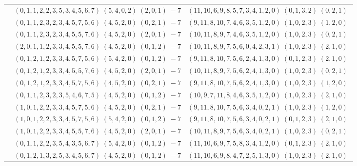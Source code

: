 \documentclass[11pt]{article}
\begin{document}
\begin{longtable}[l]{|c|c|c|}
 \cline{2-3} 
 & $(0 ,1 ,1 ,2 ,2 ,3 ,5 ,3 ,4 ,5 ,6 ,7) \;(5 ,4 ,0 ,2) \;(2 ,0 ,1) \;-7$ & $(11 ,10 ,6 ,9 ,8 ,5 ,7 ,3 ,4 ,1 ,2 ,0) \;(0 ,1 ,3 ,2) \;(0 ,2 ,1) \;$\\ 
 \cline{2-3} 
 & $(0 ,1 ,1 ,2 ,3 ,2 ,3 ,4 ,5 ,7 ,5 ,6) \;(4 ,5 ,2 ,0) \;(0 ,2 ,1) \;-7$ & $(9 ,11 ,8 ,10 ,7 ,4 ,6 ,3 ,5 ,1 ,2 ,0) \;(1 ,0 ,2 ,3) \;(1 ,2 ,0) \;$\\ 
 \cline{2-3} 
 & $(0 ,1 ,1 ,2 ,3 ,2 ,3 ,4 ,5 ,5 ,7 ,6) \;(4 ,5 ,2 ,0) \;(2 ,0 ,1) \;-7$ & $(10 ,11 ,8 ,9 ,7 ,4 ,6 ,3 ,5 ,1 ,2 ,0) \;(1 ,0 ,2 ,3) \;(0 ,2 ,1) \;$\\ 
 \cline{2-3} 
 & $(2 ,0 ,1 ,1 ,2 ,3 ,3 ,4 ,5 ,5 ,7 ,6) \;(4 ,5 ,2 ,0) \;(0 ,1 ,2) \;-7$ & $(10 ,11 ,8 ,9 ,7 ,5 ,6 ,0 ,4 ,2 ,3 ,1) \;(1 ,0 ,2 ,3) \;(2 ,1 ,0) \;$\\ 
 \cline{2-3} 
 & $(0 ,1 ,2 ,1 ,2 ,3 ,3 ,4 ,5 ,7 ,5 ,6) \;(5 ,4 ,2 ,0) \;(0 ,1 ,2) \;-7$ & $(9 ,11 ,8 ,10 ,7 ,5 ,6 ,2 ,4 ,1 ,3 ,0) \;(0 ,1 ,2 ,3) \;(2 ,1 ,0) \;$\\ 
 \cline{2-3} 
 & $(0 ,1 ,2 ,1 ,2 ,3 ,3 ,4 ,5 ,5 ,7 ,6) \;(4 ,5 ,2 ,0) \;(2 ,0 ,1) \;-7$ & $(10 ,11 ,8 ,9 ,7 ,5 ,6 ,2 ,4 ,1 ,3 ,0) \;(1 ,0 ,2 ,3) \;(0 ,2 ,1) \;$\\ 
 \cline{2-3} 
 & $(0 ,1 ,2 ,1 ,2 ,3 ,3 ,4 ,5 ,7 ,5 ,6) \;(4 ,5 ,2 ,0) \;(0 ,2 ,1) \;-7$ & $(9 ,11 ,8 ,10 ,7 ,5 ,6 ,2 ,4 ,1 ,3 ,0) \;(1 ,0 ,2 ,3) \;(1 ,2 ,0) \;$\\ 
 \cline{2-3} 
 & $(0 ,1 ,1 ,2 ,3 ,2 ,3 ,5 ,4 ,6 ,7 ,5) \;(4 ,5 ,2 ,0) \;(0 ,1 ,2) \;-7$ & $(10 ,9 ,7 ,11 ,8 ,4 ,6 ,3 ,5 ,1 ,2 ,0) \;(1 ,0 ,2 ,3) \;(2 ,1 ,0) \;$\\ 
 \cline{2-3} 
 & $(1 ,0 ,1 ,2 ,2 ,3 ,3 ,4 ,5 ,7 ,5 ,6) \;(4 ,5 ,2 ,0) \;(0 ,2 ,1) \;-7$ & $(9 ,11 ,8 ,10 ,7 ,5 ,6 ,3 ,4 ,0 ,2 ,1) \;(1 ,0 ,2 ,3) \;(1 ,2 ,0) \;$\\ 
 \cline{2-3} 
 & $(1 ,0 ,1 ,2 ,2 ,3 ,3 ,4 ,5 ,7 ,5 ,6) \;(5 ,4 ,2 ,0) \;(0 ,1 ,2) \;-7$ & $(9 ,11 ,8 ,10 ,7 ,5 ,6 ,3 ,4 ,0 ,2 ,1) \;(0 ,1 ,2 ,3) \;(2 ,1 ,0) \;$\\ 
 \cline{2-3} 
 & $(1 ,0 ,1 ,2 ,2 ,3 ,3 ,4 ,5 ,5 ,7 ,6) \;(4 ,5 ,2 ,0) \;(2 ,0 ,1) \;-7$ & $(10 ,11 ,8 ,9 ,7 ,5 ,6 ,3 ,4 ,0 ,2 ,1) \;(1 ,0 ,2 ,3) \;(0 ,2 ,1) \;$\\ 
 \cline{2-3} 
 & $(0 ,1 ,1 ,2 ,2 ,3 ,5 ,4 ,3 ,5 ,6 ,7) \;(5 ,4 ,2 ,0) \;(0 ,1 ,2) \;-7$ & $(11 ,10 ,6 ,9 ,7 ,5 ,8 ,3 ,4 ,1 ,2 ,0) \;(0 ,1 ,2 ,3) \;(2 ,1 ,0) \;$\\ 
 \cline{2-3} 
 & $(0 ,1 ,2 ,1 ,3 ,2 ,5 ,3 ,4 ,5 ,6 ,7) \;(4 ,5 ,2 ,0) \;(0 ,1 ,2) \;-7$ & $(11 ,10 ,6 ,9 ,8 ,4 ,7 ,2 ,5 ,1 ,3 ,0) \;(1 ,0 ,2 ,3) \;(2 ,1 ,0) \;$\\ 

\end{longtable}
\end{document}
